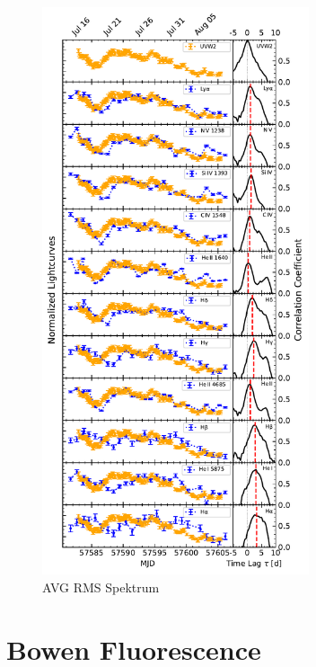 \begin{figure}[!ht]
	\centering
	\includegraphics[width=0.7\textwidth]{pictures/Chapter4/lighcurves_and_ccfs_and_time_lag_tables/UV_to_HAlpha_ccfs_and_reference_lightcurves.pdf}
	\caption{AVG RMS Spektrum}
	\label{fig:ccfs_lightcurves}
\end{figure}

\section{Bowen Fluorescence}